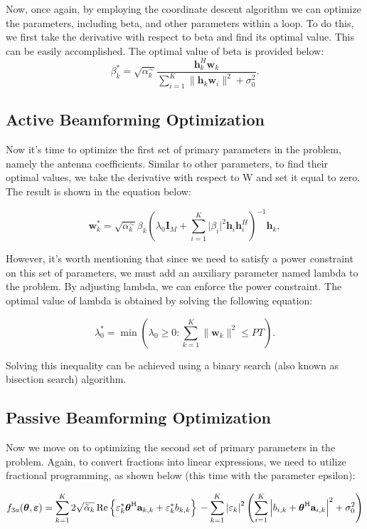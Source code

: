 \documentclass{article}
\begin{document}
Now, once again, by employing the coordinate descent algorithm we can optimize the parameters, including beta, and other parameters within a loop.
To do this, we first take the derivative with respect to beta and find its optimal value. This can be easily accomplished.
The optimal value of beta is provided below:
\[
\beta_k^* = \sqrt{\alpha_k^\sim} \frac{{\mathbf{h}_k^H \mathbf{w}_k}}{{\sum_{i=1}^{K} \lVert \mathbf{h}_k \mathbf{w}_i \rVert^2 + \sigma_0^2}}.
\]

\subsection{Active Beamforming Optimization}
Now it's time to optimize the first set of primary parameters in the problem, namely the antenna coefficients. Similar to other parameters, to find their optimal values, we take the derivative with respect to W and set it equal to zero. The result is shown in the equation below:

\[\mathbf{w}_k^* = \sqrt{\alpha_k^\sim} \beta_k \left( \lambda_0 \mathbf{I}_M + \sum_{i=1}^{K} \lvert \beta_i \rvert^2 \mathbf{h}_i \mathbf{h}_i^H \right)^{-1} \mathbf{h}_k,
\]

However, it's worth mentioning that since we need to satisfy a power constraint on this set of parameters, we must add an auxiliary parameter named lambda to the problem. By adjusting lambda, we can enforce the power constraint. The optimal value of lambda is obtained by solving the following equation:

\[
\lambda_0^* = \min \left( \lambda_0 \geq 0 : \sum_{k=1}^{K} \lVert \mathbf{w}_k \rVert^2 \leq PT \right).
\]

Solving this inequality can be achieved using a binary search (also known as bisection search) algorithm.

\subsection{Passive Beamforming Optimization}
Now we move on to optimizing the second set of primary parameters in the problem. Again, to convert fractions into linear expressions, we need to utilize fractional programming, as shown below (this time with the parameter epsilon):

\[
f_{3 a}(\boldsymbol{\theta}, \boldsymbol{\varepsilon})=  \sum_{k=1}^{K} 2 \sqrt{\tilde{\alpha}_{k}} \operatorname{Re}\left\{\varepsilon_{k}^{*} \boldsymbol{\theta}^{\mathrm{H}} \mathbf{a}_{k, k}+\varepsilon_{k}^{*} b_{k, k}\right\} \\
-\sum_{k=1}^{K}\left|\varepsilon_{k}\right|^{2}\left(\sum_{i=1}^{K}\left|b_{i, k}+\boldsymbol{\theta}^{\mathrm{H}} \mathbf{a}_{i, k}\right|^{2}+\sigma_{0}^{2}\right)
\]
\end{document}
